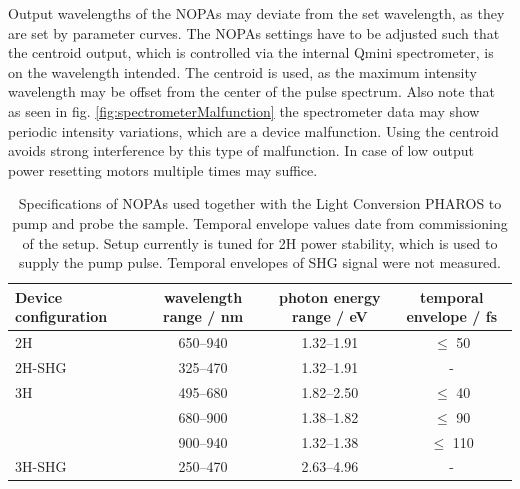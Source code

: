 \documentclass[twoside,openright,listof=numbered]{scrreprt}
\begin{document}
Output wavelengths of the NOPAs may deviate from the set wavelength, as they are set by parameter curves. The NOPAs settings have to be adjusted such that the centroid output, which is controlled via the internal Qmini spectrometer, is on the wavelength intended. The centroid is used, as the maximum intensity wavelength may be offset from the center of the pulse spectrum. Also note that as seen in fig. \ref{fig:spectrometerMalfunction} the spectrometer data may show periodic intensity variations, which are a device malfunction. Using the centroid avoids strong interference by this type of malfunction. In case of low output power resetting motors multiple times may suffice.

\begin{table}
\caption[Specifications of NOPAs used together with the Light Conversion PHAROS to pump and probe the sample.]{Specifications of NOPAs used together with the Light Conversion PHAROS to pump and probe the sample. Temporal envelope values date from commissioning of the setup. Setup currently is tuned for 2H power stability, which is used to supply the pump pulse. Temporal envelopes of SHG signal were not measured.\label{tab:NOPAs}}
\begin{tabular}{lccc}\toprule
Device configuration & wavelength range / nm & photon energy range / eV & temporal envelope / fs \\ \midrule
2H & \SIrange{650}{940}{} & \SIrange{1.32}{1.91}{} & $\leq$ 50 \\ 
2H-SHG & \SIrange{325}{470}{} & \SIrange{1.32}{1.91}{} & - \\\midrule
3H & \SIrange{495}{680}{} & \SIrange{1.82}{2.50}{} & $\leq$ 40 \\
& \SIrange{680}{900}{} & \SIrange{1.38}{1.82}{} & $\leq$ 90 \\
& \SIrange{900}{940}{} & \SIrange{1.32}{1.38}{} & $\leq$ 110 \\
3H-SHG& \SIrange{250}{470}{} & \SIrange{2.63}{4.96}{} & - \\ \bottomrule
\end{tabular}
\end{table}
\end{document}
